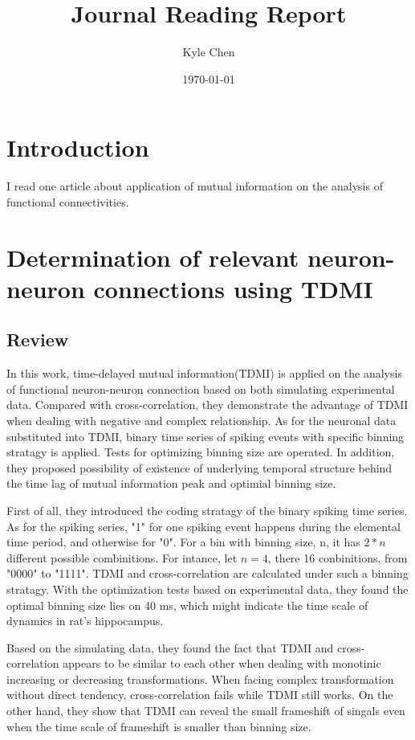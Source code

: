 \documentclass{article}[12pt]
\begin{document}
\title{Journal Reading Report}
\author{Kyle Chen}
\date{\today}

\maketitle
\tableofcontents

\section{Introduction}
I read one article about application of mutual information on the analysis of functional connectivities.

\section{Determination of relevant neuron-neuron connections using TDMI}\cite{Taghva2012}
\subsection{Review}
In this work, time-delayed mutual information(TDMI) is applied on the analysis of functional neuron-neuron connection based on both simulating experimental data. Compared with cross-correlation, they demonstrate the advantage of TDMI when dealing with negative and complex relationship. As for the neuronal data substituted into TDMI, binary time series of spiking events with specific binning stratagy is applied. Tests for optimizing binning size are operated. In addition, they proposed possibility of existence of underlying temporal structure behind the time lag of mutual information peak and optimial binning size.

First of all, they introduced the coding stratagy of the binary spiking time series. As for the spiking series, "1" for one spiking event happens during the elemental time period, and otherwise for "0". For a bin with binning size, n, it has $2*n$ different possible combinitions. For intance, let $n=4$, there 16 conbinitions, from "0000" to "1111". TDMI and cross-correlation are calculated under such a binning stratagy. With the optimization tests based on experimental data, they found the optimal binning size lies on 40 ms, which might indicate the time scale of dynamics in rat's hippocampus.

Based on the simulating data, they found the fact that TDMI and cross-correlation appears to be similar to each other when dealing with monotinic increasing or decreasing transformations. When facing complex transformation without direct tendency, cross-correlation fails while TDMI still works. On the other hand, they show that TDMI can reveal the small frameshift of singals even when the time scale of frameshift is smaller than binning size.
\end{document}
